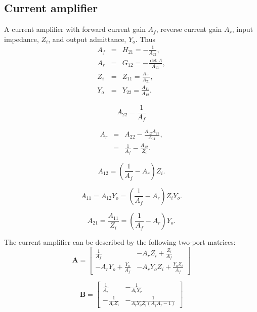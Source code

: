 \documentclass[a4paper, 12pt]{article}
\newcommand{\mat}[1]{\mathbf{#1}}
\newcommand{\encp}[1]{\left(#1\right)}
\begin{document}
\subsection{Current amplifier}

A current amplifier with forward current gain $A_f$, reverse current
gain $A_r$, input impedance, $Z_i$, and output admittance, $Y_o$.
Thus
%
\begin{eqnarray}
A_f & = &  H_{21} = -\frac{1}{A_{22}}, \\
A_r & = &  G_{12} = -\frac{\det{A}}{A_{11}}, \\
Z_i & = &  Z_{11} = \frac{A_{11}}{A_{21}}, \\
Y_o & = &  Y_{22} = \frac{A_{11}}{A_{12}}.
\end{eqnarray}

\begin{equation}
  A_{22} = \frac{1}{A_f}
\end{equation}

\begin{eqnarray}
  A_r & = & A_{22} - \frac{A_{12} A_{21}}{A_{11}}, \\
      & = & \frac{1}{A_f} - \frac{A_{12}}{Z_i}.
\end{eqnarray}

\begin{equation}
  A_{12} = \encp{\frac{1}{A_f} - A_r} Z_i.
\end{equation}

\begin{equation}
  A_{11} = A_{12} Y_o = \encp{\frac{1}{A_f} - A_r} Z_i Y_o.
\end{equation}

\begin{equation}
  A_{21} = \frac{A_{11}}{Z_i} = \encp{\frac{1}{A_f} - A_r} Y_o.
\end{equation}


The current amplifier can be described by the following two-port
matrices:
\begin{equation}
\mat{A} = \left[\begin{matrix}\frac{1}{A_{f}} & - A_{r} Z_{i} + \frac{Z_{i}}{A_{f}}\\- A_{r} Y_{o} + \frac{Y_{o}}{A_{f}} & - A_{r} Y_{o} Z_{i} + \frac{Y_{o} Z_{i}}{A_{f}}\end{matrix}\right]
\end{equation}

\begin{equation}
\mat{B} = \left[\begin{matrix}\frac{1}{A_{r}} & - \frac{1}{A_{r} Y_{o}}\\- \frac{1}{A_{r} Z_{i}} & - \frac{1}{A_{r} Y_{o} Z_{i} \left(A_{f} A_{r} - 1\right)}\end{matrix}\right]
\end{equation}
\end{document}
